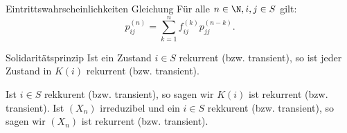 \begin{karte}{Eintrittswahrscheinlichkeiten Gleichung}
    Für alle \(n\in \N, i,j\in S\) gilt: 
    \[ p_{ij}^{(n)} = \sum_{k=1}^n f_{ij}^{(k)} p_{jj}^{(n-k)}. \]
\end{karte}

\begin{karte}{Solidaritätsprinzip}
    Ist ein Zustand \(i\in S\) rekurrent (bzw. transient), so ist 
    jeder Zustand in \(K(i)\) rekurrent (bzw. transient).

    Ist \(i \in S\) rekkurent (bzw. transient), so sagen wir 
    \(K(i)\) ist rekurrent (bzw. transient). 
    Ist \((X_n)\) irreduzibel und ein \(i \in S\) rekkurent (bzw. transient), 
    so sagen wir \((X_n)\) ist rekurrent (bzw. transient).
\end{karte}
